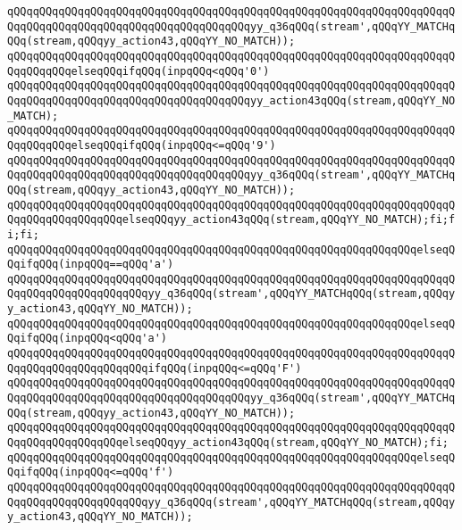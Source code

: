 \verb|qQQqqQQqqQQqqQQqqQQqqQQqqQQqqQQqqQQqqQQqqQQqqQQqqQQqqQQqqQQqqQQqqQQqqQQqqQQqqQQqqQQqqQQqqQQqqQQqqQQqqQQqqQQqyy_q36qQQq(stream',qQQqYY_MATCHqQQq(stream,qQQqyy_action43,qQQqYY_NO_MATCH));|\newline
\verb|qQQqqQQqqQQqqQQqqQQqqQQqqQQqqQQqqQQqqQQqqQQqqQQqqQQqqQQqqQQqqQQqqQQqqQQqqQQqqQQqelseqQQqifqQQq(inpqQQq<qQQq'0')|\newline
\verb|qQQqqQQqqQQqqQQqqQQqqQQqqQQqqQQqqQQqqQQqqQQqqQQqqQQqqQQqqQQqqQQqqQQqqQQqqQQqqQQqqQQqqQQqqQQqqQQqqQQqqQQqqQQqyy_action43qQQq(stream,qQQqYY_NO_MATCH);|\newline
\verb|qQQqqQQqqQQqqQQqqQQqqQQqqQQqqQQqqQQqqQQqqQQqqQQqqQQqqQQqqQQqqQQqqQQqqQQqqQQqqQQqelseqQQqifqQQq(inpqQQq<=qQQq'9')|\newline
\verb|qQQqqQQqqQQqqQQqqQQqqQQqqQQqqQQqqQQqqQQqqQQqqQQqqQQqqQQqqQQqqQQqqQQqqQQqqQQqqQQqqQQqqQQqqQQqqQQqqQQqqQQqqQQqyy_q36qQQq(stream',qQQqYY_MATCHqQQq(stream,qQQqyy_action43,qQQqYY_NO_MATCH));|\newline
\verb|qQQqqQQqqQQqqQQqqQQqqQQqqQQqqQQqqQQqqQQqqQQqqQQqqQQqqQQqqQQqqQQqqQQqqQQqqQQqqQQqqQQqqQQqelseqQQqyy_action43qQQq(stream,qQQqYY_NO_MATCH);fi;fi;fi;|\newline
\verb|qQQqqQQqqQQqqQQqqQQqqQQqqQQqqQQqqQQqqQQqqQQqqQQqqQQqqQQqqQQqqQQqelseqQQqifqQQq(inpqQQq==qQQq'a')|\newline
\verb|qQQqqQQqqQQqqQQqqQQqqQQqqQQqqQQqqQQqqQQqqQQqqQQqqQQqqQQqqQQqqQQqqQQqqQQqqQQqqQQqqQQqqQQqqQQqyy_q36qQQq(stream',qQQqYY_MATCHqQQq(stream,qQQqyy_action43,qQQqYY_NO_MATCH));|\newline
\verb|qQQqqQQqqQQqqQQqqQQqqQQqqQQqqQQqqQQqqQQqqQQqqQQqqQQqqQQqqQQqqQQqelseqQQqifqQQq(inpqQQq<qQQq'a')|\newline
\verb|qQQqqQQqqQQqqQQqqQQqqQQqqQQqqQQqqQQqqQQqqQQqqQQqqQQqqQQqqQQqqQQqqQQqqQQqqQQqqQQqqQQqqQQqqQQqifqQQq(inpqQQq<=qQQq'F')|\newline
\verb|qQQqqQQqqQQqqQQqqQQqqQQqqQQqqQQqqQQqqQQqqQQqqQQqqQQqqQQqqQQqqQQqqQQqqQQqqQQqqQQqqQQqqQQqqQQqqQQqqQQqqQQqqQQqyy_q36qQQq(stream',qQQqYY_MATCHqQQq(stream,qQQqyy_action43,qQQqYY_NO_MATCH));|\newline
\verb|qQQqqQQqqQQqqQQqqQQqqQQqqQQqqQQqqQQqqQQqqQQqqQQqqQQqqQQqqQQqqQQqqQQqqQQqqQQqqQQqqQQqqQQqelseqQQqyy_action43qQQq(stream,qQQqYY_NO_MATCH);fi;|\newline
\verb|qQQqqQQqqQQqqQQqqQQqqQQqqQQqqQQqqQQqqQQqqQQqqQQqqQQqqQQqqQQqqQQqelseqQQqifqQQq(inpqQQq<=qQQq'f')|\newline
\verb|qQQqqQQqqQQqqQQqqQQqqQQqqQQqqQQqqQQqqQQqqQQqqQQqqQQqqQQqqQQqqQQqqQQqqQQqqQQqqQQqqQQqqQQqqQQqyy_q36qQQq(stream',qQQqYY_MATCHqQQq(stream,qQQqyy_action43,qQQqYY_NO_MATCH));|\newline
